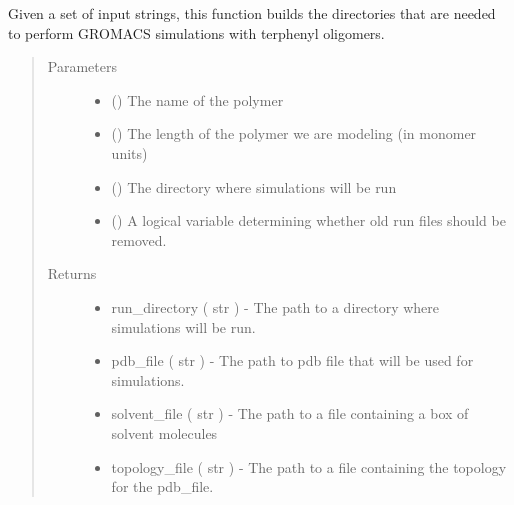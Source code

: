 \documentclass[letterpaper,12pt,english,openany,oneside]{sphinxmanual}
\begin{document}
\begin{fulllineitems}
\label{\detokenize{simulation:simulation.build_directories}}
Given a set of input strings, this function builds the directories that are needed to perform GROMACS simulations with terphenyl oligomers.
\begin{quote}\begin{description}
\item[{Parameters}] \leavevmode\begin{itemize}
\item {} 
 () \textendash{} The name of the polymer

\item {} 
 () \textendash{} The length of the polymer we are modeling (in monomer units)

\item {} 
 () \textendash{} The directory where simulations will be run

\item {} 
 () \textendash{} A logical variable determining whether old run files should be removed.

\end{itemize}

\item[{Returns}] \leavevmode
\begin{itemize}
\item {} 
run\_directory ( str ) - The path to a directory where simulations will be run.

\item {} 
pdb\_file ( str ) - The path to pdb file that will be used for simulations.

\item {} 
solvent\_file ( str ) - The path to a file containing a box of solvent molecules

\item {} 
topology\_file ( str ) - The path to a file containing the topology for the pdb\_file.

\end{itemize}


\end{description}\end{quote}

\end{fulllineitems}
\end{document}

